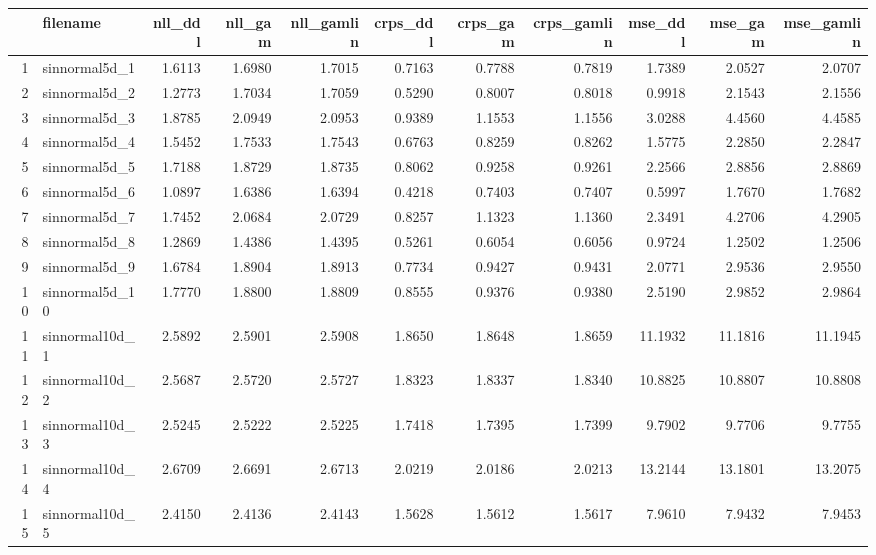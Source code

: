 \begin{table}[ht]
\centering
\begin{tabular}{rlrrrrrrrrr}
  \hline
 & filename & nll\_ddl & nll\_gam & nll\_gamlin & crps\_ddl & crps\_gam & crps\_gamlin & mse\_ddl & mse\_gam & mse\_gamlin \\ 
  \hline
1 & sinnormal5d\_1      & 1.6113 & 1.6980 & 1.7015 & 0.7163 & 0.7788 & 0.7819 & 1.7389 & 2.0527 & 2.0707 \\ 
  2 & sinnormal5d\_2    & 1.2773 & 1.7034 & 1.7059 & 0.5290 & 0.8007 & 0.8018 & 0.9918 & 2.1543 & 2.1556 \\ 
  3 & sinnormal5d\_3    & 1.8785 & 2.0949 & 2.0953 & 0.9389 & 1.1553 & 1.1556 & 3.0288 & 4.4560 & 4.4585 \\ 
  4 & sinnormal5d\_4    & 1.5452 & 1.7533 & 1.7543 & 0.6763 & 0.8259 & 0.8262 & 1.5775 & 2.2850 & 2.2847 \\ 
  5 & sinnormal5d\_5    & 1.7188 & 1.8729 & 1.8735 & 0.8062 & 0.9258 & 0.9261 & 2.2566 & 2.8856 & 2.8869 \\ 
  6 & sinnormal5d\_6    & 1.0897 & 1.6386 & 1.6394 & 0.4218 & 0.7403 & 0.7407 & 0.5997 & 1.7670 & 1.7682 \\ 
  7 & sinnormal5d\_7    & 1.7452 & 2.0684 & 2.0729 & 0.8257 & 1.1323 & 1.1360 & 2.3491 & 4.2706 & 4.2905 \\ 
  8 & sinnormal5d\_8    & 1.2869 & 1.4386 & 1.4395 & 0.5261 & 0.6054 & 0.6056 & 0.9724 & 1.2502 & 1.2506 \\ 
  9 & sinnormal5d\_9    & 1.6784 & 1.8904 & 1.8913 & 0.7734 & 0.9427 & 0.9431 & 2.0771 & 2.9536 & 2.9550 \\ 
  10 & sinnormal5d\_10  & 1.7770 & 1.8800 & 1.8809 & 0.8555 & 0.9376 & 0.9380 & 2.5190 & 2.9852 & 2.9864 \\ 
  11 & sinnormal10d\_1  & 2.5892 & 2.5901 & 2.5908 & 1.8650 & 1.8648 & 1.8659 & 11.1932 & 11.1816 & 11.1945 \\ 
  12 & sinnormal10d\_2  & 2.5687 & 2.5720 & 2.5727 & 1.8323 & 1.8337 & 1.8340 & 10.8825 & 10.8807 & 10.8808 \\ 
  13 & sinnormal10d\_3  & 2.5245 & 2.5222 & 2.5225 & 1.7418 & 1.7395 & 1.7399 & 9.7902 & 9.7706 & 9.7755 \\ 
  14 & sinnormal10d\_4  & 2.6709 & 2.6691 & 2.6713 & 2.0219 & 2.0186 & 2.0213 & 13.2144 & 13.1801 & 13.2075 \\ 
  15 & sinnormal10d\_5  & 2.4150 & 2.4136 & 2.4143 & 1.5628 & 1.5612 & 1.5617 & 7.9610 & 7.9432 & 7.9453 \\ 

\end{tabular}
\end{table}
